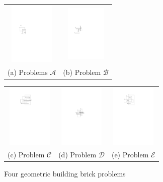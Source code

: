 \documentclass[acmsmall,review,anonymous]{acmart}
\def\figcapup{\vspace{-2mm}}
\def\figcapdown{\vspace{-4mm}}
\begin{document}
\begin{figure}
    \begin{tabular}{cc}
        \includegraphics[height=30mm]{./artwork/prob-a} &
        \includegraphics[height=27mm]{./artwork/prob-b}  \\[2mm]
        (a) Problems $\mathscr{A}$ &
        \hspace{3mm}
        (b) Problem $\mathscr{B}$ \\[3mm]
    \end{tabular}
    \begin{tabular}{ccc}
        \includegraphics[height=30mm]{./artwork/prob-c} &
        \includegraphics[height=30mm]{./artwork/prob-d} &
        \includegraphics[height=30mm]{./artwork/prob-e} \\[2mm]
        (c) Problem $\mathscr{C}$ &
        (d) Problem $\mathscr{D}$ &
        (e) Problem $\mathscr{E}$
    \end{tabular}

    \figcapup
    \caption{Four geometric building brick problems}
    \label{fig:probs}
    \figcapdown
\end{figure}
\end{document}
